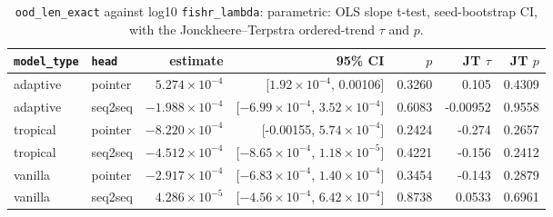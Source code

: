 \documentclass[10pt]{article}
\begin{document}
{\small
\begin{longtable}{llrrrrr}
\caption{\texttt{ood\_len\_exact} against log10 \texttt{fishr\_lambda}: parametric: OLS slope t-test, seed-bootstrap CI, with the Jonckheere--Terpstra ordered-trend $\tau$ and $p$.}\label{tab:trend-ood_len_exact}\\
\toprule
\texttt{model\_type} & \texttt{head} & estimate & 95\% CI & $p$ & JT $\tau$ & JT $p$\\
\midrule
\endhead
adaptive & pointer & $5.274\times10^{-4}$ & [$1.92\times10^{-4}$, 0.00106] & 0.3260 & 0.105 & 0.4309\\
adaptive & seq2seq & $-1.988\times10^{-4}$ & [$-6.99\times10^{-4}$, $3.52\times10^{-4}$] & 0.6083 & -0.00952 & 0.9558\\
tropical & pointer & $-8.220\times10^{-4}$ & [-0.00155, $5.74\times10^{-4}$] & 0.2424 & -0.274 & 0.2657\\
tropical & seq2seq & $-4.512\times10^{-4}$ & [$-8.65\times10^{-4}$, $1.18\times10^{-5}$] & 0.4221 & -0.156 & 0.2412\\
vanilla & pointer & $-2.917\times10^{-4}$ & [$-6.83\times10^{-4}$, $1.40\times10^{-4}$] & 0.3454 & -0.143 & 0.2879\\
vanilla & seq2seq & $4.286\times10^{-5}$ & [$-4.56\times10^{-4}$, $6.42\times10^{-4}$] & 0.8738 & 0.0533 & 0.6961\\
\bottomrule
\end{longtable}
}
\end{document}

